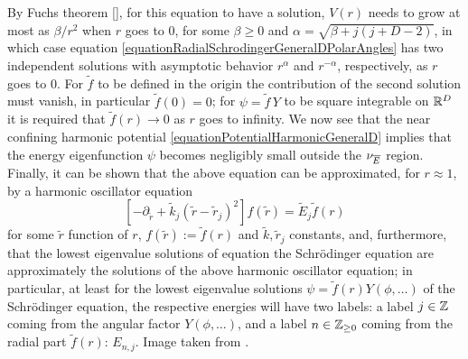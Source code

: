 By Fuchs theorem \ref{}, for this equation to have a solution, $V(r)$ needs to grow at most as $\beta/r^2$ when $r$ goes to $0$, for some $\beta \geq 0$ and $\alpha = \sqrt{\beta + j(j+D-2)}$, in which case equation \ref{equationRadialSchrodingerGeneralDPolarAngles} has two independent solutions with asymptotic behavior $r^\alpha$ and $r^{-\alpha}$, respectively, as $r$ goes to $0$. For $\tilde f$ to be defined in the origin the contribution of the second solution must vanish, in particular $\tilde f(0) = 0$; for $\psi = \tilde f\, Y$ to be square integrable on $\mathbb{R}^D$ it is required that $\tilde f(r) \to 0$ as $r$ goes to infinity.
We now see that the near confining harmonic potential \ref{equationPotentialHarmonicGeneralD} implies that the energy eigenfunction $\psi$ becomes negligibly small outside the $\nu_{\overline{E}}$ region.
Finally, it can be shown that the above equation can be approximated, for $r \approx 1$, by a harmonic oscillator equation
\begin{equation} \label{harmonicApproximationRadialSolutionGeneralD}
    [- \partial_{\tilde r} + \tilde k_j(\tilde r - \tilde r_{j})^2] f(\tilde r) = \tilde E_j \tilde f(r)
\end{equation} 
for some $\tilde r$ function of $r$, $f(\tilde r) := \tilde f(r)$ and $\tilde k, \tilde r_j$ constants, and, furthermore, that the lowest eigenvalue solutions of equation the Schr\"odinger equation are approximately the solutions of the above harmonic oscillator equation; in particular, at least for the lowest eigenvalue solutions $\psi = \tilde f(r) Y(\phi, \dots)$ of the Schr\"odinger equation, the respective energies will have two labels: a label $j \in \mathbb{Z}$ coming from the angular factor $Y(\phi, \dots)$, and a label $n \in \mathbb{Z}_{\geq 0}$ coming from the radial part $\tilde f(r)$: $E_{n, j}$. Image taken from \cite{Fiore2018}.

\lin

